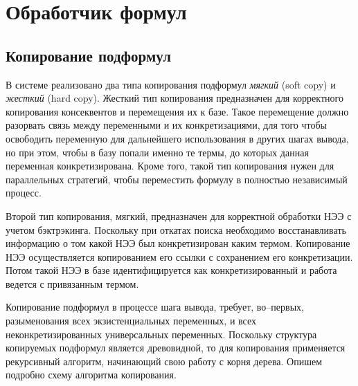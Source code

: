\section{Обработчик формул}

\subsection{Копирование подформул}
В системе реализовано два типа копирования подформул \emph{мягкий} (soft copy) и \emph{жесткий} (hard copy). Жесткий тип копирования предназначен для корректного копирования консеквентов и перемещения их к базе. Такое перемещение должно разорвать связь между переменными и их конкретизациями, для того чтобы освободить переменную для дальнейшего использования в других шагах вывода, но при этом, чтобы в базу попали именно те термы, до которых данная переменная конкретизирована. Кроме того, такой тип копирования нужен для параллельных стратегий, чтобы переместить формулу в полностью независимый процесс.

Второй тип копирования, мягкий, предназначен для корректной обработки НЭЭ с учетом бэктрэкинга. Поскольку при откатах поиска необходимо восстанавливать информацию о том какой НЭЭ был конкретизирован каким термом. Копирование НЭЭ осуществляется копированием его ссылки с сохранением его конкретизации. Потом такой НЭЭ в базе идентифицируется как конкретизированный и работа ведется с привязанным термом.

Копирование подформул в процессе шага вывода, требует, во--первых, разыменования всех экзистенциальных переменных, и всех неконкретизированных универсальных переменных. Поскольку структура копируемых подформул является древовидной, то для копирования применяется рекурсивный алгоритм, начинающий свою работу с корня дерева. Опишем подробно схему алгоритма копирования.

